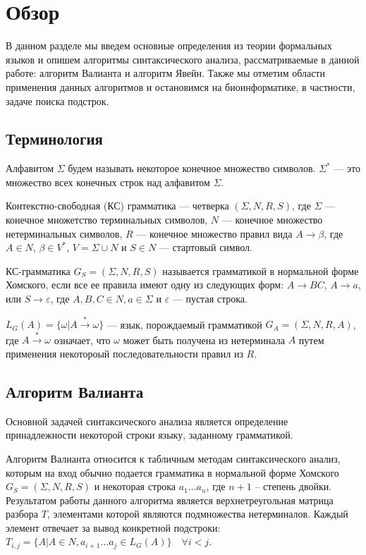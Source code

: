 \documentclass[14pt]{matmex-diploma-custom}
\begin{document}
\section{Обзор}

В данном разделе мы введем основные определения из теории формальных языков и опишем алгоритмы синтаксического анализа, рассматриваемые в данной работе: алгоритм Валианта и алгоритм Явейн. Также мы отметим области применения данных алгоритмов и остановимся на биоинформатике, в частности, задаче поиска подстрок.

\subsection{Терминология}

Алфавитом $\Sigma$ будем называть некоторое конечное множество символов.
$\Sigma^{*}$ --- это множество всех конечных строк над алфавитом $\Sigma$.

Контекстно-свободная (КС) грамматика --- четверка $(\Sigma, N, R, S)$, где $\Sigma$ --- конечное множетство терминальных символов, $N$ --- конечное множество нетерминальных символов, $R$ --- конечное множество правил вида $A \rightarrow \beta$, где $A \in N$, $\beta \in V^{*}$, $V = \Sigma \cup N$ и $S \in N$ --- стартовый символ.

КС-грамматика $G_S = (\Sigma, N, R, S)$ называется грамматикой в нормальной форме Хомского, если все ее правила имеют одну из следующих форм: $A \rightarrow BC$, $A \rightarrow a$, или $S \rightarrow \varepsilon$, 
где $A, B, C \in N, a \in \Sigma$ и $\varepsilon$ --- пустая строка.

$L_{G}(A) = \{ \omega | A\xrightarrow{*} \omega\}$ --- язык, порождаемый грамматикой $G_{A} = (\Sigma, N, R, A)$, где $A \xrightarrow{*} \omega$ означает, что $\omega$ может быть получена из нетерминала $A$ путем применения некотороый последовательности правил из $R$.

\subsection{Алгоритм Валианта}

Основной задачей синтаксического анализа является определение принадлежности некоторой строки языку, заданному грамматикой.

Алгоритм Валианта относится к табличным методам синтаксического анализ, которым на вход обычно подается грамматика в нормальной форме Хомского $G_S = (\Sigma, N, R, S)$ и некоторая строка $a_{1} \dots a_{n}$, где $n + 1$ -- степень двойки. Результатом работы данного алгоритма является верхнетреугольная матрица разбора $T$, элементами которой являются подмножества нетерминалов. Каждый элемент отвечает за вывод конкретной подстроки: $T_{i, j} =  \{ A | A \in N, a_{i + 1} \dots a_{j} \in L_{G}(A)\} \quad \forall i < j$.
\end{document}
